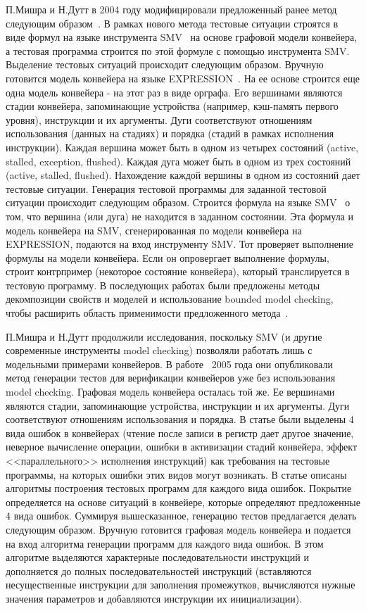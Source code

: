П.Мишра и Н.Дутт в 2004 году модифицировали предложенный ранее метод следующим образом~\cite{MishraDutt04}. В рамках нового метода тестовые ситуации строятся в виде формул на языке инструмента SMV~\cite{SMV} на основе графовой модели конвейера, а тестовая программа строится по этой формуле с помощью инструмента SMV. Выделение тестовых ситуаций происходит следующим образом. Вручную готовится модель конвейера на языке EXPRESSION~\cite{EXPRESSION}. На ее основе строится еще одна модель конвейера - на этот раз в виде орграфа. Его вершинами являются стадии конвейера, запоминающие устройства (например, кэш-память первого уровня), инструкции и их аргументы. Дуги соответствуют отношениям использования (данных на стадиях) и порядка (стадий в рамках исполнения инструкции). Каждая вершина может быть в одном из четырех состояний (active, stalled, exception, flushed). Каждая дуга может быть в одном из трех состояний (active, stalled, flushed). Нахождение каждой вершины в одном из состояний дает тестовые ситуации. Генерация тестовой программы для заданной тестовой ситуации происходит следующим образом. Строится формула на языке SMV~\cite{SMV} о том, что вершина (или дуга) не находится в заданном состоянии. Эта формула и модель конвейера на SMV, сгенерированная по модели конвейера на EXPRESSION, подаются на вход инструменту SMV. Тот проверяет выполнение формулы на модели конвейера. Если он опровергает выполнение формулы, строит контрпример (некоторое состояние конвейера), который транслируется в тестовую программу. В последующих работах были предложены методы декомпозиции свойств и моделей и использование bounded model checking, чтобы расширить область применимости предложенного метода~\cite{Mishra09}.

П.Мишра и Н.Дутт продолжили исследования, поскольку SMV (и другие современные инструменты model checking) позволяли работать лишь с модельными примерами конвейеров. В работе~\cite{MishraDutt05} 2005 года они опубликовали метод генерации тестов для верификации конвейеров уже без использования model checking. Графовая модель конвейера осталась той же. Ее вершинами являются стадии, запоминающие устройства, инструкции и их аргументы. Дуги соответствуют отношениям использования и порядка. В статье были выделены 4 вида ошибок в конвейерах (чтение после записи в регистр дает другое значение, неверное вычисление операции, ошибки в активизации стадий конвейера, эффект <<параллельного>> исполнения инструкций) как требования на тестовые программы, на которых ошибки этих видов могут возникать. В статье описаны алгоритмы построения тестовых программ для каждого вида ошибок. Покрытие определяется на основе ситуаций в конвейере, которые определяют предложенные 4 вида ошибок. Суммируя вышесказанное, генерацию тестов предлагается делать следующим образом. Вручную готовится графовая модель конвейера и подается на вход алгоритма генерации программ для каждого вида ошибок. В этом алгоритме выделяются характерные последовательности инструкций и  дополняется до полных последовательностей инструкций (вставляются несущественные инструкции для заполнения промежутков, вычисляются нужные значения параметров и добавляются инструкции их инициализации).

